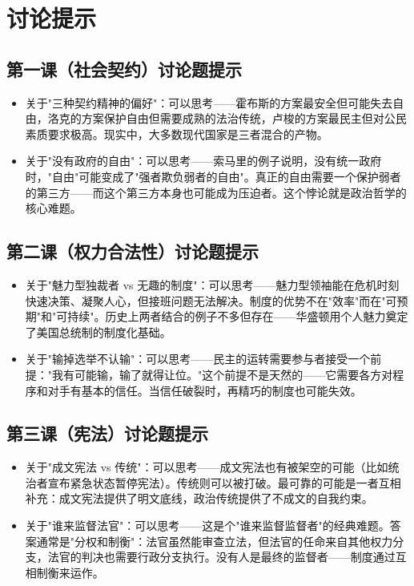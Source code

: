 \documentclass[a4paper,12pt]{ctexart}
\begin{document}
\section*{讨论提示}

\subsection*{第一课（社会契约）讨论题提示}
\begin{itemize}
  \item 关于"三种契约精神的偏好"：可以思考——霍布斯的方案最安全但可能失去自由，洛克的方案保护自由但需要成熟的法治传统，卢梭的方案最民主但对公民素质要求极高。现实中，大多数现代国家是三者混合的产物。
  \item 关于"没有政府的自由"：可以思考——索马里的例子说明，没有统一政府时，"自由"可能变成了"强者欺负弱者的自由"。真正的自由需要一个保护弱者的第三方——而这个第三方本身也可能成为压迫者。这个悖论就是政治哲学的核心难题。
\end{itemize}

\subsection*{第二课（权力合法性）讨论题提示}
\begin{itemize}
  \item 关于"魅力型独裁者 vs 无趣的制度"：可以思考——魅力型领袖能在危机时刻快速决策、凝聚人心，但接班问题无法解决。制度的优势不在"效率"而在"可预期"和"可持续"。历史上两者结合的例子不多但存在——华盛顿用个人魅力奠定了美国总统制的制度化基础。
  \item 关于"输掉选举不认输"：可以思考——民主的运转需要参与者接受一个前提："我有可能输，输了就得让位。"这个前提不是天然的——它需要各方对程序和对手有基本的信任。当信任破裂时，再精巧的制度也可能失效。
\end{itemize}

\subsection*{第三课（宪法）讨论题提示}
\begin{itemize}
  \item 关于"成文宪法 vs 传统"：可以思考——成文宪法也有被架空的可能（比如统治者宣布紧急状态暂停宪法）。传统则可以被打破。最可靠的可能是一者互相补充：成文宪法提供了明文底线，政治传统提供了不成文的自我约束。
  \item 关于"谁来监督法官"：可以思考——这是个"谁来监督监督者"的经典难题。答案通常是"分权和制衡"：法官虽然能审查立法，但法官的任命来自其他权力分支，法官的判决也需要行政分支执行。没有人是最终的监督者——制度通过互相制衡来运作。
\end{itemize}
\end{document}
